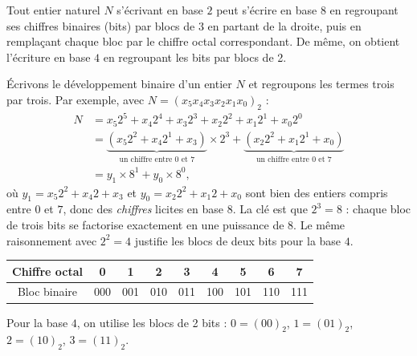 \documentclass[11pt]{article}
\newcommand{\cle}[1]{{\popxbold\color{popdark}#1}}
\begin{document}
\begin{propriete}
Tout entier naturel $N$ s'écrivant en base $2$ peut s'écrire en base $8$ en regroupant ses chiffres binaires (bits) par \cle{blocs de 3} en partant de la droite, puis en remplaçant chaque bloc par le chiffre octal correspondant. De même, on obtient l'écriture en base $4$ en regroupant les bits par \cle{blocs de 2}.
\end{propriete}

\begin{experience}
Écrivons le développement binaire d'un entier $N$ et regroupons les termes trois par trois. Par exemple, avec $N = (x_5 x_4 x_3 x_2 x_1 x_0)_2$ :
\begin{align*}
N &= x_5 2^5 + x_4 2^4 + x_3 2^3 + x_2 2^2 + x_1 2^1 + x_0 2^0 \\
&= \underbrace{\left(x_5 2^2 + x_4 2^1 + x_3\right)}_{\text{un chiffre entre } 0 \text{ et } 7}\times 2^3 + \underbrace{\left(x_2 2^2 + x_1 2^1 + x_0\right)}_{\text{un chiffre entre } 0 \text{ et } 7} \\
&= y_1 \times 8^1 + y_0 \times 8^0,
\end{align*}
où $y_1 = x_5 2^2 + x_4 2 + x_3$ et $y_0 = x_2 2^2 + x_1 2 + x_0$ sont bien des entiers compris entre $0$ et $7$, donc des \emph{chiffres} licites en base $8$. La clé est que $2^3 = 8$ : chaque bloc de trois bits se factorise exactement en une puissance de $8$. Le même raisonnement avec $2^2 = 4$ justifie les blocs de deux bits pour la base $4$.
\end{experience}

\begin{aretenir}
\begin{center}
\begin{tabular}{|c|c|c|c|c|c|c|c|c|}
\hline
\rowcolor{popblueL} Chiffre octal & 0 & 1 & 2 & 3 & 4 & 5 & 6 & 7 \\
\hline
Bloc binaire & 000 & 001 & 010 & 011 & 100 & 101 & 110 & 111 \\
\hline
\end{tabular}
\end{center}
Pour la base $4$, on utilise les blocs de 2 bits : $0 = (00)_2$, $1 = (01)_2$, $2 = (10)_2$, $3 = (11)_2$.
\end{aretenir}
\end{document}
